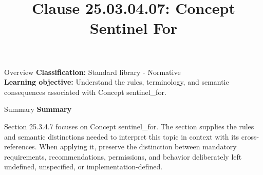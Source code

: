 \documentclass[10pt,letterpaper]{article}
\title{Clause 25.03.04.07: Concept Sentinel For}
\author{}
\date{}
\begin{document}
\maketitle
\begin{CornellOverviewBox}{Overview}
\textbf{Classification:} Standard library - Normative\\[2pt]
\textbf{Learning objective:} Understand the rules, terminology, and semantic consequences associated with Concept sentinel\_for.
\end{CornellOverviewBox}\begin{CornellSummaryBox}{Summary}
{\sffamily\bfseries\color{Accent} Summary}\par\vspace{3pt}Section 25.3.4.7 focuses on Concept sentinel\_for. The section supplies the rules and semantic distinctions needed to interpret this topic in context with its cross-references. When applying it, preserve the distinction between mandatory requirements, recommendations, permissions, and behavior deliberately left undefined, unspecified, or implementation-defined.
\end{CornellSummaryBox}
\end{document}

